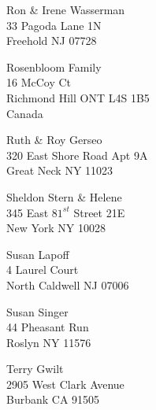 \documentclass{article}
\begin{document}
\begin{center}
\begin{Huge}
\clearpage

\vspace*{\fill}
Ron \& Irene Wasserman\\
33 Pagoda Lane 1N\\
Freehold NJ 07728\\
\vspace{\fill}

\clearpage

\vspace*{\fill}
Rosenbloom Family\\
16 McCoy Ct\\
Richmond Hill ONT L4S 1B5\\
Canada
\vspace{\fill}

\clearpage

\vspace*{\fill}
Ruth \& Roy Gerseo\\
320 East Shore Road Apt 9A\\
Great Neck NY 11023\\
\vspace{\fill}

\clearpage

\vspace*{\fill}
Sheldon Stern \& Helene\\
345 East $81^{st}$ Street 21E\\
New York NY 10028\\
\vspace{\fill}

\clearpage

\vspace*{\fill}
Susan Lapoff\\
4 Laurel Court\\
North Caldwell NJ 07006\\
\vspace{\fill}

\clearpage

\vspace*{\fill}
Susan Singer\\
44 Pheasant Run\\
Roslyn NY 11576\\
\vspace{\fill}

\clearpage

\vspace*{\fill}
Terry Gwilt\\
2905 West Clark Avenue\\
Burbank CA 91505\\
\vspace{\fill}


\end{Huge}
\end{center}
\end{document}
